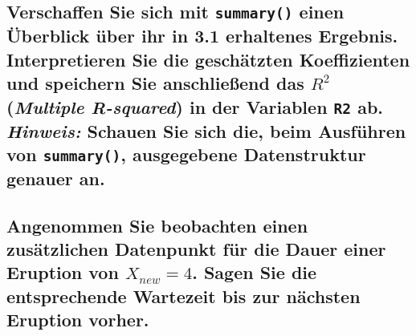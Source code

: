 \documentclass[12pt,a4paper]{article}
\begin{document}
\hypertarget{verschaffen-sie-sich-mit-summary-einen-uxfcberblick-uxfcber-ihr-in-3.1-erhaltenes-ergebnis.-interpretieren-sie-die-geschuxe4tzten-koeffizienten-und-speichern-sie-anschlieuxdfend-das-r2-multiple-r-squared-in-der-variablen-r2-ab.-hinweis-schauen-sie-sich-die-beim-ausfuxfchren-von-summary-ausgegebene-datenstruktur-genauer-an.}{%
\subsection{\texorpdfstring{Verschaffen Sie sich mit \texttt{summary()}
einen Überblick über ihr in 3.1 erhaltenes Ergebnis. Interpretieren Sie
die geschätzten Koeffizienten und speichern Sie anschließend das \(R^2\)
(\emph{Multiple R-squared}) in der Variablen \texttt{R2} ab.
\emph{Hinweis:} Schauen Sie sich die, beim Ausführen von
\texttt{summary()}, ausgegebene Datenstruktur genauer
an.}{Verschaffen Sie sich mit summary() einen Überblick über ihr in 3.1 erhaltenes Ergebnis. Interpretieren Sie die geschätzten Koeffizienten und speichern Sie anschließend das R\^{}2 (Multiple R-squared) in der Variablen R2 ab. Hinweis: Schauen Sie sich die, beim Ausführen von summary(), ausgegebene Datenstruktur genauer an.}}\label{verschaffen-sie-sich-mit-summary-einen-uxfcberblick-uxfcber-ihr-in-3.1-erhaltenes-ergebnis.-interpretieren-sie-die-geschuxe4tzten-koeffizienten-und-speichern-sie-anschlieuxdfend-das-r2-multiple-r-squared-in-der-variablen-r2-ab.-hinweis-schauen-sie-sich-die-beim-ausfuxfchren-von-summary-ausgegebene-datenstruktur-genauer-an.}}

\hypertarget{angenommen-sie-beobachten-einen-zusuxe4tzlichen-datenpunkt-fuxfcr-die-dauer-einer-eruption-von-x_new4.-sagen-sie-die-entsprechende-wartezeit-bis-zur-nuxe4chsten-eruption-vorher.}{%
\subsection{\texorpdfstring{Angenommen Sie beobachten einen zusätzlichen
Datenpunkt für die Dauer einer Eruption von \(X_{new}=4\). Sagen Sie die
entsprechende Wartezeit bis zur nächsten Eruption
vorher.}{Angenommen Sie beobachten einen zusätzlichen Datenpunkt für die Dauer einer Eruption von X\_\{new\}=4. Sagen Sie die entsprechende Wartezeit bis zur nächsten Eruption vorher.}}\label{angenommen-sie-beobachten-einen-zusuxe4tzlichen-datenpunkt-fuxfcr-die-dauer-einer-eruption-von-x_new4.-sagen-sie-die-entsprechende-wartezeit-bis-zur-nuxe4chsten-eruption-vorher.}}
\end{document}

